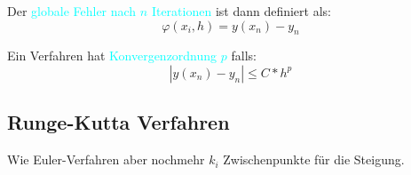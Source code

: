 Der \textcolor{cyan}{globale Fehler nach $n$ Iterationen} ist dann definiert als:
$$\varphi(x_i, h) = y(x_n) - y_n$$

Ein Verfahren hat \textcolor{cyan}{Konvergenzordnung $p$} falls:
$$|y(x_n) - y_n| \le C * h^p$$










\subsection{Runge-Kutta Verfahren}

Wie Euler-Verfahren aber nochmehr $k_i$ Zwischenpunkte für die Steigung.



